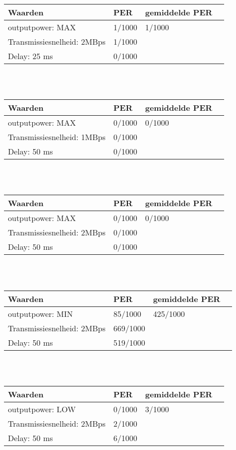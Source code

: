 \documentclass{article}
\begin{document}
    \begin{tabular}{ | l | l | l | p{5cm} |}
    \hline
    Waarden & PER & gemiddelde PER\\ \hline
    outputpower: MAX & 1/1000 & 1/1000\\ \hline
    Transmissiesnelheid: 2MBps & 1/1000 &  \\ \hline
    Delay: 25 ms & 0/1000&  \\
    \hline
    \end{tabular}\\
    \\
    
    \begin{tabular}{ | l | l | l | p{5cm} |}
    \hline
    Waarden & PER & gemiddelde PER\\ \hline
    outputpower: MAX & 0/1000 & 0/1000\\ \hline
    Transmissiesnelheid: 1MBps & 0/1000 &  \\ \hline
    Delay: 50 ms & 0/1000 &   \\
    \hline
    \end{tabular}\\
    \\
    
    \begin{tabular}{ | l | l | l | p{5cm} |}
    \hline
    Waarden & PER & gemiddelde PER\\ \hline
    outputpower: MAX & 0/1000 & 0/1000\\ \hline
    Transmissiesnelheid: 2MBps & 0/1000 &  \\ \hline
    Delay: 50 ms & 0/1000&  \\
    \hline
    \end{tabular}\\
    \\
    
    \begin{tabular}{ | l | l | l | p{5cm} |}
    \hline
    Waarden & PER & gemiddelde PER\\ \hline
    outputpower: MIN & 85/1000 & 425/1000\\ \hline
    Transmissiesnelheid: 2MBps & 669/1000  &  \\ \hline
    Delay: 50 ms & 519/1000 &  \\
    \hline
    \end{tabular}\\
    \\
    
    \begin{tabular}{ | l | l | l | p{5cm} |}
    \hline
    Waarden & PER & gemiddelde PER\\ \hline
    outputpower: LOW & 0/1000 & 3/1000\\ \hline
    Transmissiesnelheid: 2MBps & 2/1000 &   \\ \hline
    Delay: 50 ms & 6/1000 &  \\
    \hline
    \end{tabular}\\
    \\
    
\end{document}
